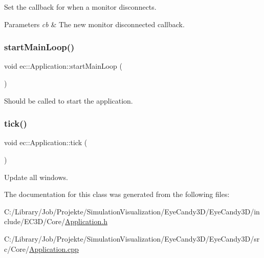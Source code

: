 Set the callback for when a monitor disconnects. 


\begin{DoxyParams}{Parameters}
{\em cb} & The new monitor disconnected callback. \\
\hline
\end{DoxyParams}
\mbox{\label{classec_1_1_application_ad541044a8fc0ff8d6c3fc57220109a50}} 
\subsubsection{\texorpdfstring{start\+Main\+Loop()}{startMainLoop()}}
{\footnotesize\ttfamily void ec\+::\+Application\+::start\+Main\+Loop (\begin{DoxyParamCaption}{ }\end{DoxyParamCaption})\hspace{0.3cm}{\ttfamily [virtual]}}



Should be called to start the application. 

\mbox{\label{classec_1_1_application_a036ae53bcbf708c7a01deb199feeccdf}} 
\subsubsection{\texorpdfstring{tick()}{tick()}}
{\footnotesize\ttfamily void ec\+::\+Application\+::tick (\begin{DoxyParamCaption}{ }\end{DoxyParamCaption})\hspace{0.3cm}{\ttfamily [virtual]}}



Update all windows. 



The documentation for this class was generated from the following files\+:\begin{DoxyCompactItemize}
\item 
C\+:/\+Library/\+Job/\+Projekte/\+Simulation\+Visualization/\+Eye\+Candy3\+D/\+Eye\+Candy3\+D/include/\+E\+C3\+D/\+Core/\mbox{\hyperlink{_application_8h}{Application.\+h}}\item 
C\+:/\+Library/\+Job/\+Projekte/\+Simulation\+Visualization/\+Eye\+Candy3\+D/\+Eye\+Candy3\+D/src/\+Core/\mbox{\hyperlink{_application_8cpp}{Application.\+cpp}}\end{DoxyCompactItemize}
